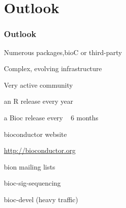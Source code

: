 \documentclass{beamer}
\begin{document}
\section{Outlook}
\begin{frame}
 \frametitle{Outlook}
  \bit
      \item Numerous packages,bioC or third-party
      \item Complex, evolving infrastructure
      \item Very active community
	\bit
	    \item an R release every year
	    \item a Bioc release every ~ 6 months
	    \item bioconductor website
	      \bit
		  \item \url{http://bioconductor.org}
	      \eit
	     \item bion mailing lists
	      \bit
		  \item bioc-sig-sequencing
		  \item bioc-devel (heavy traffic)
	      \eit
	      
	\eit
  \eit
\end{frame}

     
\end{document}

